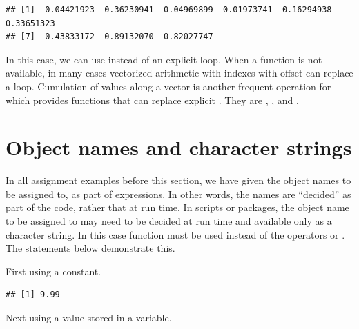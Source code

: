 \documentclass[krantz2]{krantz}\usepackage{knitr}%
\begin{document}
\begin{explainbox}
\begin{knitrout}\footnotesize
{}\color{fgcolor}\begin{kframe}
\begin{alltt}
 \hlkwb{<-} \hlstd{(} \hlopt{-} \hlstd{)}
   \hlstd{(} 
     \hlkwb{<-} \hlstd{a.vector[i} \hlopt{+} \hlstd{]} \hlopt{-} 
  \hlstd{\}}
\end{alltt}
\begin{verbatim}
## [1] -0.04421923 -0.36230941 -0.04969899  0.01973741 -0.16294938  0.33651323
## [7] -0.43833172  0.89132070 -0.82027747
\end{verbatim}
\end{kframe}
\end{knitrout}

In this case, we can use  instead of an explicit loop. When a function is not available, in many cases vectorized arithmetic with indexes with offset can replace a  loop.
Cumulation of values along a vector is another frequent operation for which \Rlang provides functions that can replace explicit . They are , ,  and .

\end{explainbox}

\section{Object names and character strings}

In all assignment examples before this section, we have given the object names to be assigned to, as part of expressions. In other words, the names are ``decided'' as part of the code, rather that at run time. In scripts or packages, the object name to be assigned to may need to be decided at run time and available only as a character string. In this case function  must be used instead of the operators \code{<-} or \code{->}. The statements below demonstrate this.

First using a  constant.

\begin{knitrout}\footnotesize
{}\color{fgcolor}\begin{kframe}
\begin{alltt}
\hlstd{(}\hlstd{,} \hlstd{)}
\end{alltt}
\begin{verbatim}
## [1] 9.99
\end{verbatim}
\end{kframe}
\end{knitrout}
Next using a  value stored in a variable.
\end{document}

